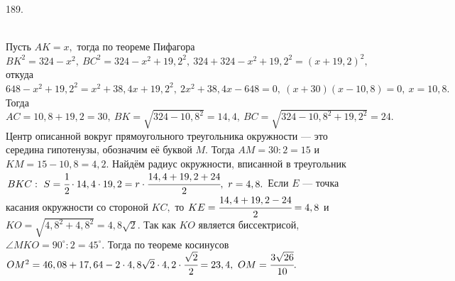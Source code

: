 \documentclass[12pt]{article}
\begin{document}
189. \begin{figure}[ht!]
\end{figure}\\
Пусть $AK=x,$ тогда по теореме Пифагора $BK^2=324-x^2,\ BC^2=324-x^2+19,2^2,\ 324+324-x^2+19,2^2=(x+19,2)^2,$ откуда $648-x^2+19,2^2=x^2+38,4x+19,2^2,\
2x^2+38,4x-648=0,\ (x+30)(x-10,8)=0,\ x=10,8.$ Тогда $AC=10,8+19,2=30,\ BK=\sqrt{324-10,8^2}=14,4,\ BC=\sqrt{324-10,8^2+19,2^2}=24.$ Центр описанной вокруг прямоугольного треугольника окружности --- это середина гипотенузы, обозначим её буквой $M.$ Тогда $AM=30:2=15$ и $KM=15-10,8=4,2.$ Найдём радиус окружности, вписанной в треугольник $BKC:\ S=\cfrac{1}{2}\cdot14,4\cdot19,2=r\cdot\cfrac{14,4+19,2+24}{2},\ r=4,8.$ Если $E$ --- точка касания окружности со стороной $KC,$ то $KE=\cfrac{14,4+19,2-24}{2}=4,8$ и $KO=\sqrt{4,8^2+4,8^2}=4,8\sqrt{2}.$ Так как $KO$ является биссектрисой, $\angle MKO=90^\circ:2=45^\circ.$ Тогда по теореме косинусов $OM^2=46,08+17,64-2\cdot4,8\sqrt{2}\cdot4,2\cdot\cfrac{\sqrt{2}}{2}=23,4,\ OM=\cfrac{3\sqrt{26}}{10}.$\\
\end{document}
